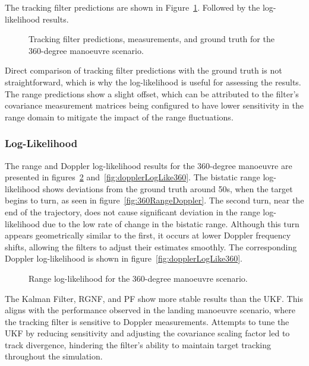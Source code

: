 The tracking filter predictions are shown in Figure~\ref{fig:360FilterOutputs}. Followed by the log-likelihood results.

\begin{figure}[H]
    \centering
    
    \caption{Tracking filter predictions, measurements, and ground truth for the 360-degree manoeuvre scenario.}
    \label{fig:360FilterOutputs}
\end{figure}
Direct comparison of tracking filter predictions with the ground truth is not straightforward, which is why the log-likelihood is useful for assessing the results. The range predictions show a slight offset, which can be attributed to the filter's covariance measurement matrices being configured to have lower sensitivity in the range domain to mitigate the impact of the range fluctuations.

\subsubsection{Log-Likelihood}
The range and Doppler log-likelihood results for the 360-degree manoeuvre are presented in figures~\ref{fig:rangeLogLike360} and~\ref{fig:dopplerLogLike360}. The bistatic range log-likelihood shows deviations from the ground truth around 50s, when the target begins to turn, as seen in figure~\ref{fig:360RangeDoppler}. The second turn, near the end of the trajectory, does not cause significant deviation in the range log-likelihood due to the low rate of change in the bistatic range. Although this turn appears geometrically similar to the first, it occurs at lower Doppler frequency shifts, allowing the filters to adjust their estimates smoothly. The corresponding Doppler log-likelihood is shown in figure~\ref{fig:dopplerLogLike360}.

\begin{figure}[H]
    \centering
    
    \caption{Range log-likelihood for the 360-degree manoeuvre scenario.}
    \label{fig:rangeLogLike360}
\end{figure}

The Kalman Filter, \ac{RGNF}, and \ac{PF} show more stable results than the \ac{UKF}. This aligns with the performance observed in the landing manoeuvre scenario, where the tracking filter is sensitive to Doppler measurements. Attempts to tune the \ac{UKF} by reducing sensitivity and adjusting the covariance scaling factor led to track divergence, hindering the filter's ability to maintain target tracking throughout the simulation.


